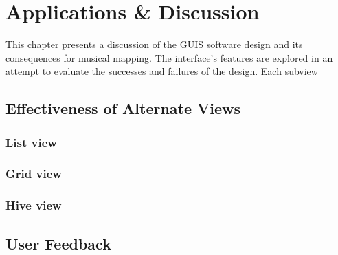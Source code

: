 \chapter{Applications \& Discussion}

This chapter presents a discussion of the GUIS software design and its consequences for musical mapping. The interface's features are explored in an attempt to evaluate the successes and failures of the design. Each subview 

\section{Effectiveness of Alternate Views} %
\label{sec:effectiveness_of_alternate_views}

	\subsection{List view} %
	\label{sub:list_view}

	

	\subsection{Grid view} %
	\label{sub:grid_view}
	

	\subsection{Hive view} %
	\label{sub:hive_view}
	


\section{User Feedback} %
\label{sec:user_feedback}

